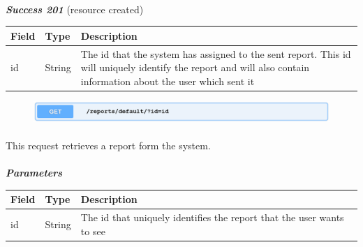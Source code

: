 						\paragraph{}
							\textcolor{myGreen}{\textit{\textbf{Success 201}}} (resource created)
							\vspace{-2mm}
							\begin{table}[!h]
								\begin{tabular}{L{0.15\textwidth}L{0.15\textwidth}L{0.58\textwidth}}
									\toprule
									\textbf{Field} & \textbf{Type} & \textbf{Description} \\
									\midrule
									id & String & The id that the system has assigned to the sent report. This id will uniquely identify the report and will also contain information about the user which sent it\\
								 	\bottomrule
								\end{tabular}
							\end{table}
						
						\clearpage
						\begin{figure}[!h]
							\includegraphics[width=\textwidth]{images/Restful/RetrieveReport}
						\end{figure}
						\paragraph{}
						\vspace{-7.5mm}
						This request retrieves a report form the system.
						\paragraph{}
							\textcolor{myBlue}{\textbf{\textit{Parameters}}}
							\vspace{-2mm}
							\begin{table}[!h]
								\begin{tabular}{L{0.15\textwidth}L{0.15\textwidth}L{0.58\textwidth}}
									\toprule
									\textbf{Field} & \textbf{Type} & \textbf{Description} \\
									\midrule
								 	id & String & The id that uniquely identifies the report that the user wants to see \\
								 	\bottomrule
								\end{tabular}
							\end{table}
